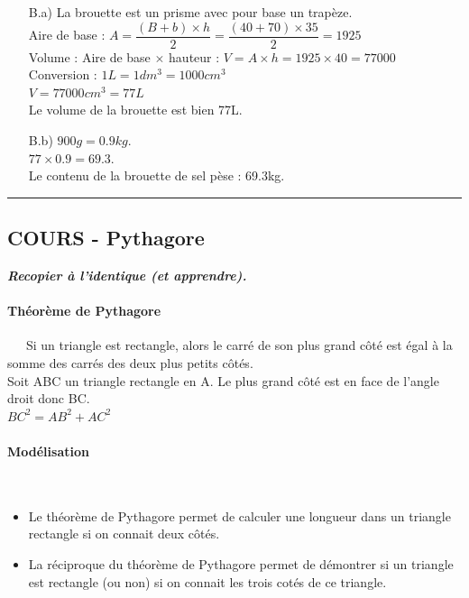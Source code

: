 \documentclass[11pt]{article}
\newcommand{\horrule}[1]{\rule{\linewidth}{#1}} %
\begin{document}
\begin{multicols}{2}
\begin{itemize}
	\item[B.a)] La brouette est un prisme avec pour base un trapèze.\\
	Aire de base : $A = \dfrac{(B+b)\times h}{2} = \dfrac{(40+70)\times 35}{2} = 1925$\\
	Volume : Aire de base $\times$ hauteur : $V = A \times h = 1925 \times 40 = 77000$\\
	Conversion : $1L = 1dm^3 = 1000cm^3$\\
	$V = 77000 cm^3 = 77 L$\\
	Le volume de la brouette est bien 77L. 
	\item[B.b)]	$900 g = 0.9 kg$.\\
	$77 \times 0.9 = 69.3$.\\
	Le contenu de la brouette de sel pèse : 69.3kg.
\end{itemize}

\end{multicols}
\horrule{1px} 
\begin{multicols}{2}

\subsection*{COURS - Pythagore}
\textit{\textbf{Recopier à l'identique (et apprendre).}}
\paragraph{Théorème de Pythagore}~~\
Si un triangle est rectangle, alors le carré de son plus grand côté est égal à la somme des carrés des deux plus petits côtés.\\
Soit ABC un triangle rectangle en A. Le plus grand côté est en face de l'angle droit donc BC.\\
$BC^2 = AB^2 + AC^2$ 
\paragraph{Modélisation}~~\
\begin{itemize}
	\item Le théorème de Pythagore permet de calculer une longueur dans un triangle rectangle si on connait deux côtés.
	\item La réciproque du théorème de Pythagore permet de démontrer si un triangle est rectangle (ou non) si on connait les trois cotés de ce triangle. 
\end{itemize}
\end{multicols}
\end{document}
